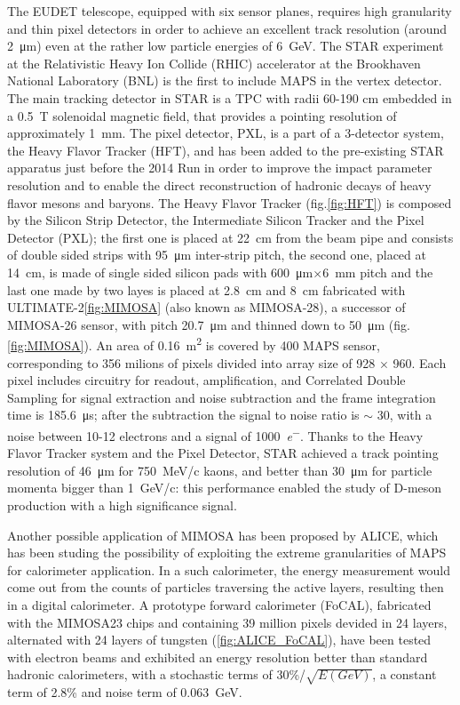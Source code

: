         The EUDET telescope, equipped with six sensor planes, requires high granularity and thin pixel detectors in order to achieve an excellent track resolution (around \SI{2}{\um}) even at the rather low particle energies of \SI{6}{GeV}.
        The STAR experiment at the Relativistic Heavy Ion Collide (RHIC) accelerator at the Brookhaven National Laboratory (BNL) is the first to include MAPS in the vertex detector\cite{STAR}.
        The main tracking detector in STAR is a TPC with radii 60-190 cm  embedded in a \SI{0.5}{T} solenoidal magnetic field, that provides a pointing resolution of approximately \SI{1}{mm}. 
        The pixel detector, PXL, is a part of a 3-detector system, the Heavy Flavor Tracker (HFT), and has been added to the pre-existing STAR apparatus just before the 2014 Run in order to improve the impact parameter resolution and to enable the direct reconstruction of hadronic decays of heavy flavor mesons and baryons.     
        The Heavy Flavor Tracker (fig.\ref{fig:HFT}) is composed by the Silicon Strip Detector, the Intermediate Silicon Tracker and the Pixel Detector (PXL); the first one is placed at \SI{22}{cm} from the beam pipe and consists of double sided strips with \SI{95}{\um} inter-strip pitch, the second one, placed at \SI{14}{cm}, is made of single sided silicon pads with \SI{600}{\um}$\times$\SI{6}{mm} pitch and the last one made by two layes is placed at \SI{2.8}{cm} and \SI{8}{cm} fabricated with ULTIMATE-2\ref{fig:MIMOSA} (also known as MIMOSA-28), a successor of MIMOSA-26 sensor, with pitch \SI{20.7}{\um} and thinned down to \SI{50}{\um} (fig.\ref{fig:MIMOSA}).
        An area of \SI{0.16}{m\squared} is covered by 400 MAPS sensor, corresponding to 356 milions of pixels divided into array size of 928 $\times$ 960.
        Each pixel includes circuitry for readout, amplification, and Correlated Double Sampling for signal extraction and noise subtraction and the frame integration time is \SI{185.6}{\us}; after the subtraction the signal to noise ratio is $\sim$ 30, with a noise between 10-12 electrons and a signal of \SI{1000}{\elementarycharge ^-}.
        Thanks to the Heavy Flavor Tracker system and the Pixel Detector, STAR achieved a track pointing resolution of \SI{46}{\um} for \SI{750}{MeV/c} kaons, and better than \SI{30}{\um} for particle momenta bigger than \SI{1}{GeV/c}: this performance enabled the study of D-meson production with a high significance signal.

        Another possible application of MIMOSA has been proposed by ALICE, which has been studing the possibility of exploiting the extreme granularities of MAPS for calorimeter application\cite{review_calo}. In a such calorimeter, the energy measurement would come out from the counts of particles traversing the active layers, resulting then in a digital calorimeter. A prototype forward calorimeter (FoCAL), fabricated with the MIMOSA23 chips and containing 39 million pixels devided in 24 layers, alternated with 24 layers of tungsten (\ref{fig:ALICE_FoCAL}), have been tested with electron beams and exhibited an energy resolution better than standard hadronic calorimeters, with a stochastic terms of 30\%/$\sqrt{E(GeV)}$, a constant term of 2.8\% and noise term of \SI{0.063}{GeV}.

